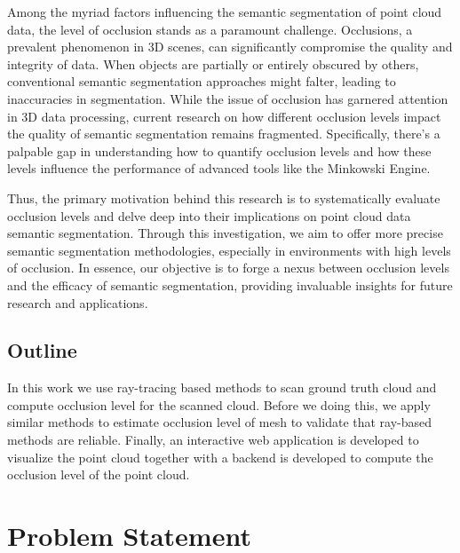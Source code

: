 \documentclass[11pt, a4paper,oneside,chapterprefix=false]{scrbook}
\begin{document}
Among the myriad factors influencing the semantic segmentation of point cloud data, the level of occlusion stands as a paramount challenge. Occlusions, a prevalent phenomenon in 3D scenes, can significantly compromise the quality and integrity of data. When objects are partially or entirely obscured by others, conventional semantic segmentation approaches might falter, leading to inaccuracies in segmentation. While the issue of occlusion has garnered attention in 3D data processing, current research on how different occlusion levels impact the quality of semantic segmentation remains fragmented. Specifically, there's a palpable gap in understanding how to quantify occlusion levels and how these levels influence the performance of advanced tools like the Minkowski Engine. 

\vspace{10pt}

Thus, the primary motivation behind this research is to systematically evaluate occlusion levels and delve deep into their implications on point cloud data semantic segmentation. Through this investigation, we aim to offer more precise semantic segmentation methodologies, especially in environments with high levels of occlusion. In essence, our objective is to forge a nexus between occlusion levels and the efficacy of semantic segmentation, providing invaluable insights for future research and applications.

\section{Outline} \label{sec:outline}

In this work we use ray-tracing based methods to scan ground truth cloud and compute occlusion level for the scanned cloud. Before we doing this, we apply similar methods to estimate occlusion level of mesh to validate that ray-based methods are reliable. Finally, an interactive web application is developed to visualize the point cloud together with a backend is developed to compute the occlusion level of the point cloud.


\chapter{Problem Statement} \label{chp:problem}
\end{document}
